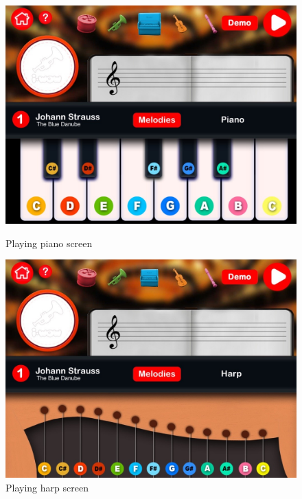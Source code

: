 \begin{figure}[ht!]
	\centering
	\includegraphics[width=400pt]{graphics/use-case/playing_piano_screen.jpg}
	\vspace{0.05cm}
	\caption{Playing piano screen}
	\label{fig:playing_piano_screen}

	\vspace{0.6cm}
	
	\includegraphics[width=400pt]{graphics/use-case/playing_harp_screen.jpg}
	\vspace{0.05cm}
	\caption{Playing harp screen}
	\label{fig:playing_harp_screen}
\end{figure}


